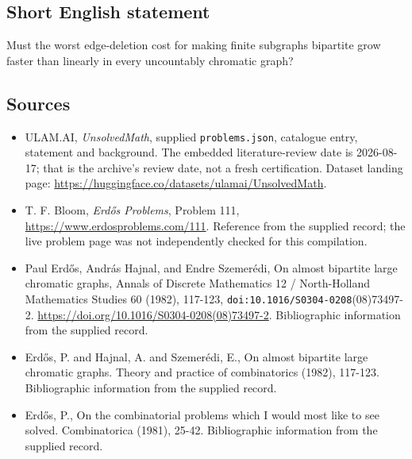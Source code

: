 \documentclass[11pt,a4paper]{article}
\begin{document}
\subsection{Short English statement}

Must the worst edge-deletion cost for making finite subgraphs bipartite grow faster than linearly in every uncountably chromatic graph?

\subsection{Sources}

{\small

\begin{itemize}

\item[\hypertarget{source:statement:1}{S1}] ULAM.AI, \emph{UnsolvedMath}, supplied \texttt{problems.json}, catalogue entry, statement and background. The embedded literature-review date is 2026-08-17; that is the archive’s review date, not a fresh certification. Dataset landing page: \url{https://huggingface.co/datasets/ulamai/UnsolvedMath}.

\item[\hypertarget{source:statement:2}{S2}] T. F. Bloom, \emph{Erdős Problems}, Problem 111, \url{https://www.erdosproblems.com/111}. Reference from the supplied record; the live problem page was not independently checked for this compilation.

\item[\hypertarget{source:statement:3}{S3}] Paul Erdős, András Hajnal, and Endre Szemerédi, On almost bipartite large chromatic graphs, Annals of Discrete Mathematics 12 / North-Holland Mathematics Studies 60 (1982), 117-123, \nolinkurl{doi:10.1016/S0304-0208}(08)73497-2. \url{https://doi.org/10.1016/S0304-0208(08)73497-2}. Bibliographic information from the supplied record.

\item[\hypertarget{source:statement:4}{S4}] Erd\H{o}s, P. and Hajnal, A. and Szemer\'{e}di, E., On almost bipartite large chromatic graphs. Theory and practice of combinatorics (1982), 117-123. Bibliographic information from the supplied record.

\item[\hypertarget{source:statement:5}{S5}] Erd\H{o}s, P., On the combinatorial problems which I would most like to see solved. Combinatorica (1981), 25-42. Bibliographic information from the supplied record.

\end{itemize}

}

\label{end:statement}
\end{document}

